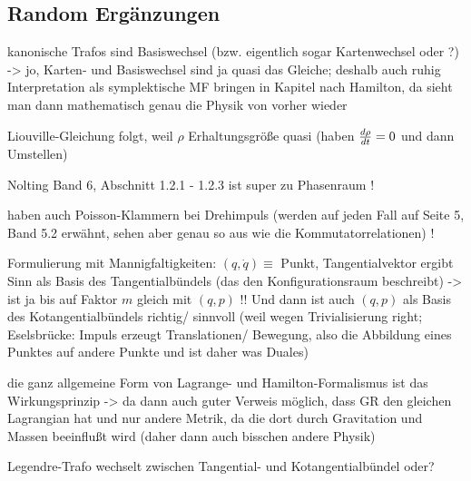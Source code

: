 \documentclass[../class_mech_main.tex]{subfiles}
\begin{document}
		\subsection{Random Ergänzungen}

kanonische Trafos sind Basiswechsel (bzw. eigentlich sogar Kartenwechsel oder ?) -> jo, Karten- und Basiswechsel sind ja quasi das Gleiche; deshalb auch ruhig Interpretation als symplektische MF bringen in Kapitel nach Hamilton, da sieht man dann mathematisch genau die Physik von vorher wieder

Liouville-Gleichung folgt, weil $\rho$ Erhaltungsgröße quasi (haben $\dv{\rho}{t} = 0$ und dann Umstellen)

Nolting Band 6, Abschnitt 1.2.1 - 1.2.3 ist super zu Phasenraum !


haben auch Poisson-Klammern bei Drehimpuls (werden auf jeden Fall auf Seite 5, Band 5.2 erwähnt, sehen aber genau so aus wie die Kommutatorrelationen) !



Formulierung mit Mannigfaltigkeiten: $(q,\dot{q}) \equiv$ Punkt, Tangentialvektor ergibt Sinn als Basis des Tangentialbündels (das den Konfigurationsraum beschreibt) -> ist ja bis auf Faktor $m$ gleich mit $(q, p)$ !! Und dann ist auch $(q,p)$ als Basis des Kotangentialbündels richtig/ sinnvoll (weil wegen Trivialisierung right; Eselsbrücke: Impuls erzeugt Translationen/ Bewegung, also die Abbildung eines Punktes auf andere Punkte und ist daher was Duales)



die ganz allgemeine Form von Lagrange- und Hamilton-Formalismus ist das Wirkungsprinzip -> da dann auch guter Verweis möglich, dass GR den gleichen Lagrangian hat und nur andere Metrik, da die dort durch Gravitation und Massen beeinflußt wird (daher dann auch bisschen andere Physik)

Legendre-Trafo wechselt zwischen Tangential- und Kotangentialbündel oder?
\end{document}
